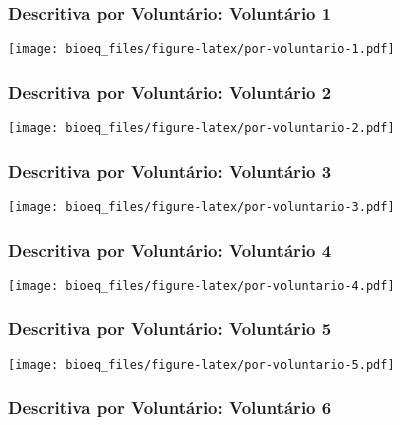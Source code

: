 \documentclass[
]{article}
\begin{document}
\hypertarget{descritiva-por-voluntuxe1rio-voluntuxe1rio-1}{%
\subsubsection{Descritiva por Voluntário: Voluntário
1}\label{descritiva-por-voluntuxe1rio-voluntuxe1rio-1}}

\texttt{[image: bioeq\_files/figure-latex/por-voluntario-1.pdf]}

\hypertarget{descritiva-por-voluntuxe1rio-voluntuxe1rio-2}{%
\subsubsection{Descritiva por Voluntário: Voluntário
2}\label{descritiva-por-voluntuxe1rio-voluntuxe1rio-2}}

\texttt{[image: bioeq\_files/figure-latex/por-voluntario-2.pdf]}

\hypertarget{descritiva-por-voluntuxe1rio-voluntuxe1rio-3}{%
\subsubsection{Descritiva por Voluntário: Voluntário
3}\label{descritiva-por-voluntuxe1rio-voluntuxe1rio-3}}

\texttt{[image: bioeq\_files/figure-latex/por-voluntario-3.pdf]}

\hypertarget{descritiva-por-voluntuxe1rio-voluntuxe1rio-4}{%
\subsubsection{Descritiva por Voluntário: Voluntário
4}\label{descritiva-por-voluntuxe1rio-voluntuxe1rio-4}}

\texttt{[image: bioeq\_files/figure-latex/por-voluntario-4.pdf]}

\hypertarget{descritiva-por-voluntuxe1rio-voluntuxe1rio-5}{%
\subsubsection{Descritiva por Voluntário: Voluntário
5}\label{descritiva-por-voluntuxe1rio-voluntuxe1rio-5}}

\texttt{[image: bioeq\_files/figure-latex/por-voluntario-5.pdf]}

\hypertarget{descritiva-por-voluntuxe1rio-voluntuxe1rio-6}{%
\subsubsection{Descritiva por Voluntário: Voluntário
6}\label{descritiva-por-voluntuxe1rio-voluntuxe1rio-6}}
\end{document}
